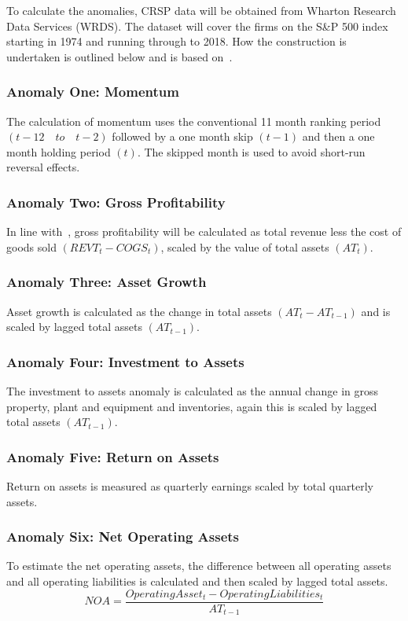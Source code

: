 \documentclass[a4paper]{article}                 %
\begin{document}
To calculate the anomalies, CRSP data will be obtained from Wharton Research Data Services (WRDS). The dataset will cover the firms on the S\&P 500 index starting in 1974 and running through to 2018. How the construction is undertaken is outlined below and is based on~\cite{chu2017causal}.

\subsubsection*{Anomaly One: Momentum}
The calculation of momentum uses the conventional 11 month ranking period \((t-12 \quad to \quad t-2)\) followed by a one month skip $(t-1)$ and then a one month holding period $(t)$. The skipped month is used to avoid short-run reversal effects.

\subsubsection*{Anomaly Two: Gross Profitability}
In line with~\cite{novy2013other}, gross profitability will be calculated as total revenue less the cost of goods sold \((REVT_t-COGS_t)\), scaled by the value of total assets $(AT_t)$. 

\subsubsection*{Anomaly Three: Asset Growth}
Asset growth is calculated as the change in total assets \((AT_t  - AT_{t-1})\) and is scaled by lagged total assets \((AT_{t-1})\).

\subsubsection*{Anomaly Four: Investment to Assets}
The investment to assets anomaly is calculated as the annual change in gross property, plant and equipment and inventories, again this is scaled by lagged total assets \((AT_{t-1})\). 

\subsubsection*{Anomaly Five: Return on Assets}
Return on assets is measured as quarterly earnings scaled by total quarterly assets. 

\subsubsection*{Anomaly Six: Net Operating Assets}
To estimate the net operating assets, the difference between all operating assets and all operating liabilities is calculated and then scaled by lagged total assets.
\[
NOA= \frac{Operating Asset_t-Operating Liabilities_t}{AT_{t-1}}\]
\end{document}
